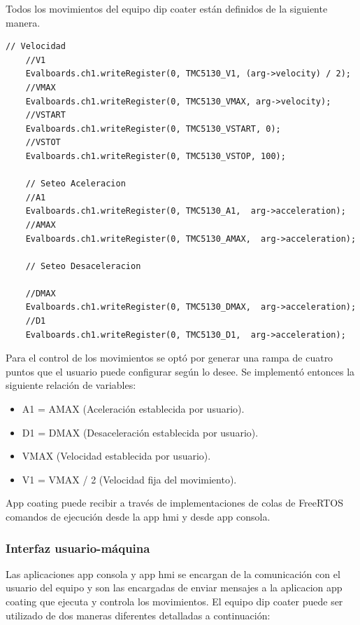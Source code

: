 Todos los movimientos del equipo dip coater están definidos de la siguiente manera.
\begin{lstlisting}[label=cod:vControl,caption=Macros para configurar de desplazamientos.] 
	// Velocidad
	//V1
	Evalboards.ch1.writeRegister(0, TMC5130_V1, (arg->velocity) / 2);
	//VMAX
	Evalboards.ch1.writeRegister(0, TMC5130_VMAX, arg->velocity);
	//VSTART
	Evalboards.ch1.writeRegister(0, TMC5130_VSTART, 0);
	//VSTOT
	Evalboards.ch1.writeRegister(0, TMC5130_VSTOP, 100);

	// Seteo Aceleracion
	//A1
	Evalboards.ch1.writeRegister(0, TMC5130_A1,  arg->acceleration);
	//AMAX
	Evalboards.ch1.writeRegister(0, TMC5130_AMAX,  arg->acceleration);

	// Seteo Desaceleracion

	//DMAX
	Evalboards.ch1.writeRegister(0, TMC5130_DMAX,  arg->acceleration);
	//D1
	Evalboards.ch1.writeRegister(0, TMC5130_D1,  arg->acceleration);
\end{lstlisting}

Para el control de los movimientos se optó por generar una rampa de cuatro puntos que el usuario puede configurar según lo desee. Se implementó entonces la siguiente relación de variables:

\begin{itemize}
\item A1 = AMAX  (Aceleración establecida por usuario).
\item D1 = DMAX  (Desaceleración establecida por usuario).
\item VMAX 	  (Velocidad establecida por usuario).
\item V1 = VMAX / 2 (Velocidad fija del movimiento).

\end{itemize}

 
App coating puede recibir a través de implementaciones de colas de FreeRTOS comandos de ejecución desde la app hmi y desde app consola.

\subsubsection{Interfaz usuario-máquina}


Las aplicaciones app consola y app hmi se encargan de la comunicación con el usuario del equipo y son las encargadas de enviar mensajes a la aplicacion app coating que ejecuta  y controla los movimientos.
El equipo dip coater puede ser utilizado de dos maneras diferentes detalladas a continuación:

